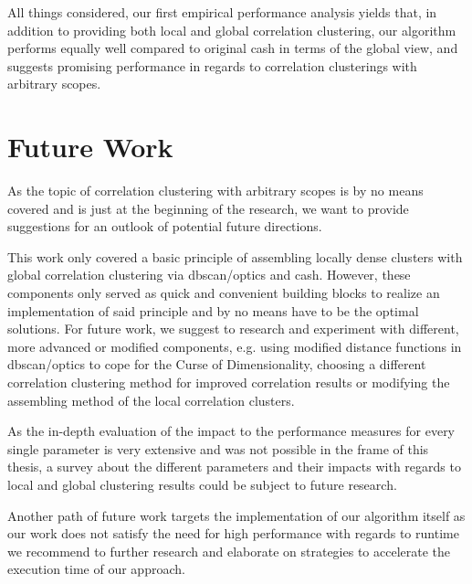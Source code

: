 All things considered, our first empirical performance analysis yields that, in addition to providing both local and global correlation clustering, our algorithm performs equally well compared to original \gls{cash} in terms of the global view, and suggests promising performance in regards to correlation clusterings with arbitrary scopes.

\chapter{Future Work}\label{ch:futurework}
As the topic of correlation clustering with arbitrary scopes is by no means covered and is just at the beginning of the research, we want to provide suggestions for an outlook of potential future directions. 

This work only covered a basic principle of assembling locally dense clusters with global correlation clustering via \gls{dbscan}/\gls{optics} and \gls{cash}. However, these components only served as quick and convenient building blocks to realize an implementation of said principle and by no means have to be the optimal solutions. For future work, we suggest to research and experiment with different, more advanced or modified components, e.g. using modified distance functions in \gls{dbscan}/\gls{optics} to cope for the Curse of Dimensionality, choosing a different correlation clustering method for improved correlation results or modifying the assembling method of the local correlation clusters.

As the in-depth evaluation of the impact to the performance measures for every single parameter is very extensive and was not possible in the frame of this thesis, a survey about the different parameters and their impacts with regards to local and global clustering results could be subject to future research.

Another path of future work targets the implementation of our algorithm itself as our work does not satisfy the need for high performance with regards to runtime we recommend to further research and elaborate on strategies to accelerate the execution time of our approach.


